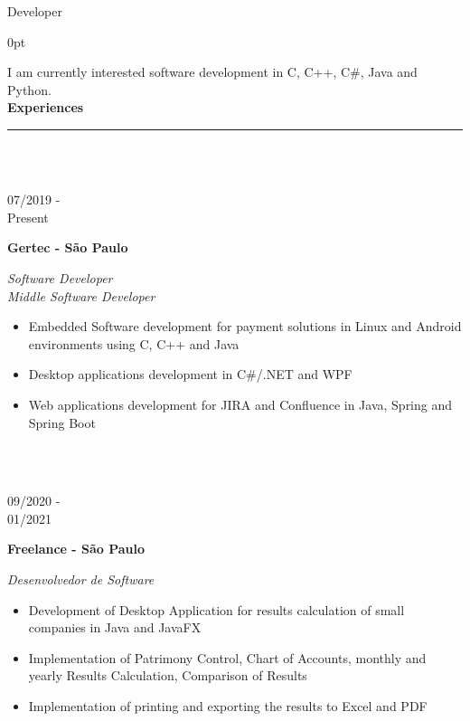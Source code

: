 \documentclass[a4paper]{article}
\begin{document}
	\LARGE Developer
	\vspace{12.5pt}
	\begin{adjustwidth}{\parindent}{0pt}
	\begin{minipage}[t]{0.65\textwidth}
	\large I am currently interested software development in C, C++, C\#, Java and Python.\\

  \Large{\textbf{Experiences}} \normalsize \\ \rule{\textwidth}{0.5pt} \\ \\
  
  \begin{minipage}[t]{0.2\textwidth}
    \large{07/2019 - \\ Present}
    \end{minipage}
    \begin{minipage}[t]{0.8\textwidth}
    {
      \setlength{\parskip}{5.5pt}
      \Large{\textbf{Gertec - São Paulo}}
    
      \large{\textit{Software Developer}} \\
      \large{\textit{Middle Software Developer}}
      \begin{itemize}
        \item \normalsize{Embedded Software development for payment solutions in Linux and Android environments using C, C++ and Java}
        \item \normalsize{Desktop applications development in C\#/.NET and WPF}
        \item \normalsize{Web applications development for JIRA and Confluence in Java, Spring and Spring Boot}
      \end{itemize}
    }
  \end{minipage} \\ \\

  \begin{minipage}[t]{0.2\textwidth}
    \large{09/2020 - \\ 01/2021}
    \end{minipage}
    \begin{minipage}[t]{0.8\textwidth}
    {
      \setlength{\parskip}{5.5pt}
      \Large{\textbf{Freelance - São Paulo}}
    
      \large{\textit{Desenvolvedor de Software}}
      \begin{itemize}
        \item \normalsize{Development of Desktop Application for results calculation of small companies in Java and JavaFX}
        \item \normalsize{Implementation of Patrimony Control, Chart of Accounts, monthly and yearly Results Calculation, Comparison of Results}
        \item \normalsize{Implementation of printing and exporting the results to Excel and PDF}
      \end{itemize}
    }
    \end{minipage} \\ \\


\end{minipage}
\end{adjustwidth}
\end{document}
